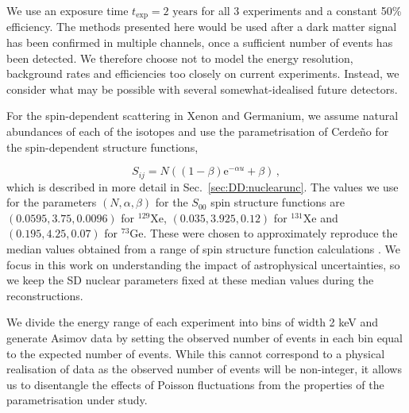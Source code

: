 We use an exposure time $t_\textrm{exp} = 2 \textrm{ years}$ for all 3 experiments and a constant 50\% efficiency. The methods presented here would be used after a dark matter signal has been confirmed in multiple channels, once a sufficient number of events has been detected. We therefore choose not to model the energy resolution, background rates and efficiencies too closely on current experiments. Instead, we consider what may be possible with several somewhat-idealised future detectors.

For the spin-dependent scattering in Xenon and Germanium, we assume natural abundances of each of the isotopes and use the parametrisation of Cerde\~{n}o \etal \cite{Cerdeno:2012} for the spin-dependent structure functions,

\begin{equation}
\label{eq:NT:SDparametrization}
S_{ij} = N ((1-\beta)\mathrm{e}^{-\alpha u} + \beta)\,,
\end{equation}
which is described in more detail in Sec.~\ref{sec:DD:nuclearunc}. The values we use
for the parameters $(N, \alpha, \beta)$ for the $S_{00}$ spin structure functions are $(0.0595, 3.75, 0.0096)$ for $^{129}$Xe,
$(0.035, 3.925, 0.12)$ for $^{131}$Xe and $(0.195, 4.25, 0.07)$ for $^{73}$Ge. These
were chosen to approximately reproduce the median values obtained from a range
of spin structure function calculations \cite{Ressel:1993,Dimitrov:1995,Ressell:1997,Menendez:2012}. We focus in this work on understanding the impact of astrophysical uncertainties, so we keep the SD nuclear parameters fixed at these median values during the reconstructions.

We divide the energy range of each experiment into bins of width 2 keV and generate Asimov data \cite{Cowan:2013} by setting the observed number of events in each bin equal to the expected number of events. While this cannot correspond to a physical realisation of data as the observed number of events will be non-integer, it allows us to disentangle the effects of Poisson fluctuations from the properties of the parametrisation under study.

